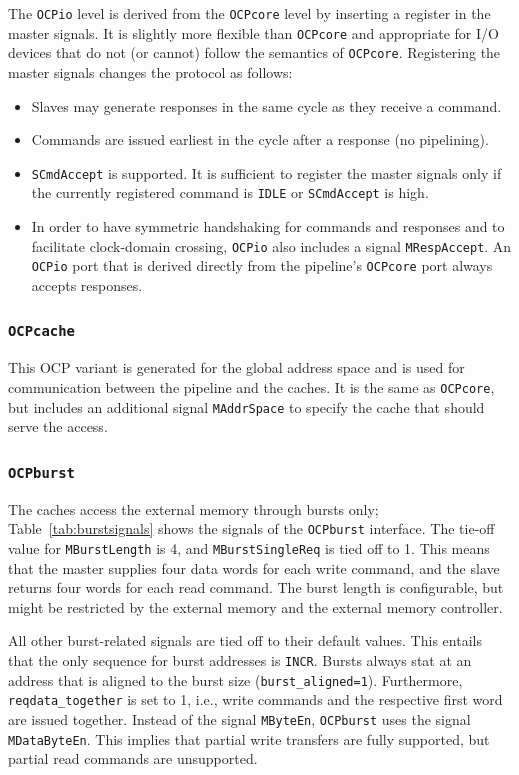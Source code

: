 \documentclass[a4paper,fontsize=10pt,twoside,DIV15,BCOR12mm,headinclude=true,footinclude=false,pagesize,bibtotoc]{scrbook}
\newcommand{\code}[1]{{\texttt{#1}}}
\newcommand{\comment}[3]{

\textsf{\textbf{#1}} {\color{#3}#2}}
\newcommand{\wolf}[1]{\comment{Wolfgang}{#1}{OliveGreen}}
\newcommand{\martin}[1]{\comment{Martin}{#1}{Blue}}
\renewcommand{\wolf}[1]{}
\renewcommand{\martin}[1]{}
\begin{document}
The \code{OCPio} level is derived from the \code{OCPcore} level by
inserting a register in the master signals. It is slightly more
flexible than \code{OCPcore} and appropriate for I/O devices that do
not (or cannot) follow the semantics of \code{OCPcore}. Registering
the master signals changes the protocol as follows:
\begin{itemize}
\item Slaves may generate responses in the same cycle as they
  receive a command.
\item Commands are issued earliest in the cycle after a response (no
  pipelining).
\item \code{SCmdAccept} is supported. It is sufficient to register the
  master signals only if the currently registered command is
  \code{IDLE} or \code{SCmdAccept} is high.
\item In order to have symmetric handshaking for commands and
  responses and to facilitate clock-domain crossing, \code{OCPio} also
  includes a signal \code{MRespAccept}. An \code{OCPio} port that is
  derived directly from the pipeline's \code{OCPcore} port always
  accepts responses.
\end{itemize}

\subsubsection{\code{OCPcache}}

This OCP variant is generated for the global address space and is used
for communication between the pipeline and the caches. It is the same
as \code{OCPcore}, but includes an additional signal \code{MAddrSpace}
to specify the cache that should serve the access.

\subsubsection{\code{OCPburst}}

The caches access the external memory through bursts only;
Table~\ref{tab:burstsignals} shows the signals of the \code{OCPburst}
interface. The tie-off value for \code{MBurstLength} is 4, and
\code{MBurstSingleReq} is tied off to 1. This means that the master
supplies four data words for each write command, and the slave returns
four words for each read command. The burst length is configurable,
but might be restricted by the external memory and the external
memory controller.
\martin{I assume (hope) that the configurable burst length works.
One could try varying with the SRAM memory.} 
\wolf{Depends on how cleanly the code was written and on the
  hardware. The synchronous SRAM only supports burst lengths $\leq$4
  due to restrictions of the memory chip.}
All other burst-related signals are
tied off to their default values. This entails that the only sequence
for burst addresses is \code{INCR}. Bursts always stat at an address
that is aligned to the burst size
(\code{burst\_aligned=1}). Furthermore, \code{reqdata\_together} is
set to 1, i.e., write commands and the respective first word are
issued together. Instead of the signal \code{MByteEn}, \code{OCPburst}
uses the signal \code{MDataByteEn}. This implies that partial write
transfers are fully supported, but partial read commands are
unsupported.
\end{document}
